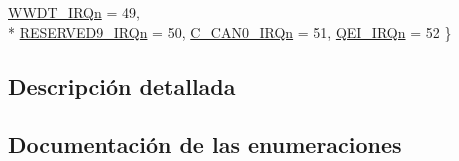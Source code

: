 \begin{DoxyCompactItemize}
\hyperlink{group___c_m_s_i_s__18_x_x___i_r_q_ggaa44deabd252bda567898bae35a086adca87a86cbd9c4a352c290aaf6f492bcce5}{W\+W\+D\+T\+\_\+\+I\+R\+Qn} = 49, 
\\*
\hyperlink{group___c_m_s_i_s__18_x_x___i_r_q_ggaa44deabd252bda567898bae35a086adca599e1e8a7dee019b56a748eccc6a5787}{R\+E\+S\+E\+R\+V\+E\+D9\+\_\+\+I\+R\+Qn} = 50, 
\hyperlink{group___c_m_s_i_s__18_x_x___i_r_q_ggaa44deabd252bda567898bae35a086adca646fe1670a0623976ee89d8ee2ffcd76}{C\+\_\+\+C\+A\+N0\+\_\+\+I\+R\+Qn} = 51, 
\hyperlink{group___c_m_s_i_s__18_x_x___i_r_q_ggaa44deabd252bda567898bae35a086adca82471ba65527ad3f3da8af38acb953bf}{Q\+E\+I\+\_\+\+I\+R\+Qn} = 52
 \}
\end{DoxyCompactItemize}


\subsection{Descripción detallada}


\subsection{Documentación de las enumeraciones}
